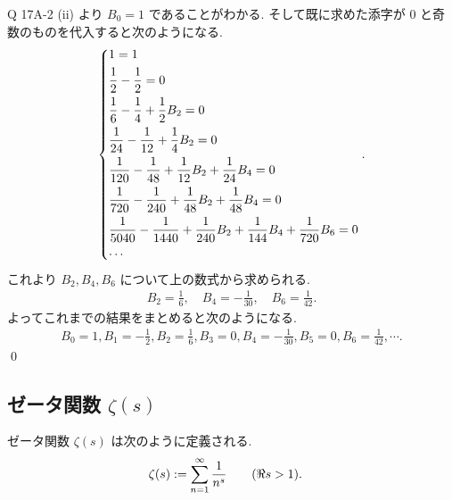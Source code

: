 \documentclass[uplatex,dvipdfmx,a4paper,11pt]{jlreq}
\makeatletter
\theoremstyle{definition}
\renewenvironment{proof}[1][\proofname]{\par
  \normalfont
  \topsep6\p@\@plus6\p@ \trivlist
  \item[\hskip\labelsep{\bfseries #1}\@addpunct{\bfseries}]\ignorespaces\quad\par
}{%
  \qed\endtrivlist\@endpefalse
}
\renewcommand\proofname{証明}
\makeatother
\begin{document}
\begin{proof}
  Q 17A-2 (ii) より $B_0 = 1$ であることがわかる. そして既に求めた添字が 0 と奇数のものを代入すると次のようになる.
  \begin{align}
    \begin{dcases}
      1 = 1                                                                                        \\
      \frac{1}{2} - \frac{1}{2} = 0                                                                \\
      \frac{1}{6} - \frac{1}{4} + \frac{1}{2}B_2 = 0                                               \\
      \frac{1}{24} - \frac{1}{12} + \frac{1}{4}B_2 = 0                                             \\
      \frac{1}{120} - \frac{1}{48} + \frac{1}{12}B_2 + \frac{1}{24}B_4 = 0                         \\
      \frac{1}{720} - \frac{1}{240} + \frac{1}{48}B_2 + \frac{1}{48}B_4 = 0                        \\
      \frac{1}{5040} - \frac{1}{1440} + \frac{1}{240}B_2 + \frac{1}{144}B_4 + \frac{1}{720}B_6 = 0 \\
      \cdots
    \end{dcases}.
  \end{align}
  これより $B_2, B_4, B_6$ について上の数式から求められる.
  \begin{align}
    B_2 = \frac{1}{6}, \quad B_4 = -\frac{1}{30}, \quad B_6 = \frac{1}{42}.
  \end{align}
  よってこれまでの結果をまとめると次のようになる.
  \begin{align}
    B_0 = 1, B_1 = -\frac{1}{2}, B_2 = \frac{1}{6}, B_3 = 0, B_4 = -\frac{1}{30}, B_5 = 0, B_6 = \frac{1}{42}, \cdots.
  \end{align}
\end{proof}




\subsection{ゼータ関数 $\zeta(s)$}
\begin{definition}[ゼータ関数]
  ゼータ関数 $\zeta(s)$ は次のように定義される.
  \begin{align}
    \zeta(s) & := \sum_{n=1}^{\infty}\frac{1}{n^s} \qquad (\real s > 1).
  \end{align}
\end{definition}
\end{document}
